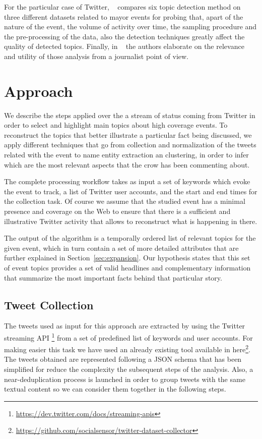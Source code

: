\documentclass{sig-alternate}
\begin{document}
For the particular case of Twitter, ~\cite{Aiello} compares six topic detection method on three different datasets related to mayor events for probing that, apart of the nature of the event, the volume of activity over time, the sampling procedure and the pre-processing of the data, also the detection techniques greatly affect the quality of detected topics. Finally, in ~\cite{Schifferes} the authors elaborate on the relevance and utility of those analysis from a journalist point of view.


\section{Approach}

We describe the steps applied over the a stream of status coming from Twitter in order to select and highlight main topics about high coverage events. To reconstruct the topics that better illustrate a particular fact being discussed, we apply different techniques that go from collection and normalization of the tweets related with the event to name entity extraction an clustering, in order to infer which are the most relevant aspects that the crow has been commenting about.

The complete processing workflow takes as input a set of keywords which evoke the event to track, a list of Twitter user accounts, and the start and end times for the collection task. Of course we assume that the studied event has a minimal presence and coverage on the Web to ensure that there is a sufficient and illustrative Twitter activity that allows to reconstruct what is happening in there. 

The output of the algorithm is a temporally ordered list of relevant topics for the given event, which in turn contain a set of more detailed attributes that are further explained in Section~\ref{sec:expansion}. Our hypothesis states that this set of event topics provides a set of valid headlines and complementary information that summarize the most important facts behind that particular story. 

\subsection{Tweet Collection}

The tweets used as input for this approach are extracted by using the Twitter streaming API \footnote{\fontsize{8pt}{1em}\selectfont \url{https://dev.twitter.com/docs/streaming-apis}} from a set of predefined list of keywords and user accounts. For making easier this task we have used an already existing tool available in here\footnote{\fontsize{8pt}{1em}\selectfont \url{https://github.com/socialsensor/twitter-dataset-collector}}. The tweets obtained are represented following a JSON schema that has been simplified for reduce the complexity the subsequent steps of the analysis. Also, a near-deduplication process is launched in order to group tweets with the same textual content so we can consider them together in the following steps.
\end{document}
